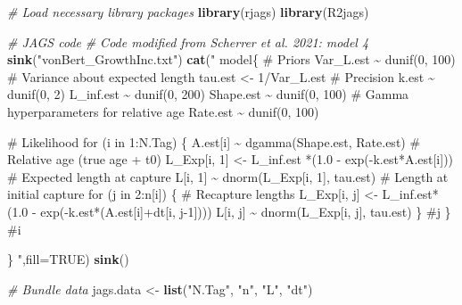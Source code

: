 \documentclass[
]{krantz}
\makeatletter
\newenvironment{Shaded}{\begin{snugshade}}{\end{snugshade}}
\newcommand{\AttributeTok}[1]{\textcolor[rgb]{0.27,0.27,0.27}{#1}}
\newcommand{\CommentTok}[1]{\textcolor[rgb]{0.37,0.37,0.37}{\textit{#1}}}
\newcommand{\ConstantTok}[1]{\textcolor[rgb]{0.37,0.37,0.37}{#1}}
\newcommand{\FunctionTok}[1]{\textcolor[rgb]{0.27,0.27,0.27}{\textbf{#1}}}
\newcommand{\NormalTok}[1]{#1}
\newcommand{\OtherTok}[1]{\textcolor[rgb]{0.37,0.37,0.37}{#1}}
\newcommand{\StringTok}[1]{\textcolor[rgb]{0.5,0.5,0.5}{#1}}
\newenvironment{kframe}{%
\medskip{}
\setlength{\fboxsep}{.8em}
 \def\at@end@of@kframe{}%
 \ifinner\ifhmode%
  \def\at@end@of@kframe{\end{minipage}}%
  \begin{minipage}{\columnwidth}%
 \fi\fi%
 \def\FrameCommand##1{\hskip\@totalleftmargin \hskip-\fboxsep
 \colorbox{shadecolor}{##1}\hskip-\fboxsep
     \hskip-\linewidth \hskip-\@totalleftmargin \hskip\columnwidth}%
 \MakeFramed {\advance\hsize-\width
   \@totalleftmargin\z@ \linewidth\hsize
   \@setminipage}}%
 {\par\unskip\endMakeFramed%
 \at@end@of@kframe}
\renewenvironment{Shaded}{\begin{kframe}}{\end{kframe}}
\makeatother
\begin{document}
\begin{Shaded}
\begin{Highlighting}[]
\CommentTok{\# Load necessary library packages}
\FunctionTok{library}\NormalTok{(rjags)}
\FunctionTok{library}\NormalTok{(R2jags)}

\CommentTok{\# JAGS code}
\CommentTok{\# Code modified from Scherrer et al. 2021: model 4}
\FunctionTok{sink}\NormalTok{(}\StringTok{"vonBert\_GrowthInc.txt"}\NormalTok{)}
\FunctionTok{cat}\NormalTok{(}\StringTok{"}
\StringTok{model\{}
\StringTok{\# Priors}
\StringTok{  Var\_L.est \textasciitilde{} dunif(0, 100) \# Variance about expected length}
\StringTok{  tau.est \textless{}{-} 1/Var\_L.est \# Precision}
\StringTok{    k.est \textasciitilde{} dunif(0, 2)}
\StringTok{    L\_inf.est \textasciitilde{} dunif(0, 200)}
\StringTok{    Shape.est \textasciitilde{} dunif(0, 100) \# Gamma hyperparameters for relative age}
\StringTok{    Rate.est \textasciitilde{} dunif(0, 100)}

\StringTok{    \# Likelihood}
\StringTok{    for (i in 1:N.Tag)   \{}
\StringTok{        A.est[i] \textasciitilde{} dgamma(Shape.est, Rate.est)}
\StringTok{          \# Relative age (true age + t0)}
\StringTok{        L\_Exp[i, 1] \textless{}{-}   L\_inf.est *(1.0 {-} exp({-}k.est*A.est[i])) }
\StringTok{          \# Expected length at capture}
\StringTok{        L[i, 1] \textasciitilde{} dnorm(L\_Exp[i, 1], tau.est) }
\StringTok{          \# Length at initial capture}
\StringTok{        for (j in 2:n[i])   \{ \# Recapture lengths}
\StringTok{            L\_Exp[i, j] \textless{}{-}  L\_inf.est*(1.0 {-}}
\StringTok{                              exp({-}k.est*(A.est[i]+dt[i, j{-}1])))}
\StringTok{            L[i, j] \textasciitilde{} dnorm(L\_Exp[i, j], tau.est)}
\StringTok{        \} \#j}
\StringTok{    \} \#i}

\StringTok{\}}
\StringTok{    "}\NormalTok{,}\AttributeTok{fill=}\ConstantTok{TRUE}\NormalTok{)}
\FunctionTok{sink}\NormalTok{()}

\CommentTok{\# Bundle data}
\NormalTok{jags.data }\OtherTok{\textless{}{-}} \FunctionTok{list}\NormalTok{(}\StringTok{"N.Tag"}\NormalTok{, }\StringTok{"n"}\NormalTok{, }\StringTok{"L"}\NormalTok{, }\StringTok{"dt"}\NormalTok{)}


\end{Highlighting}
\end{Shaded}
\end{document}
